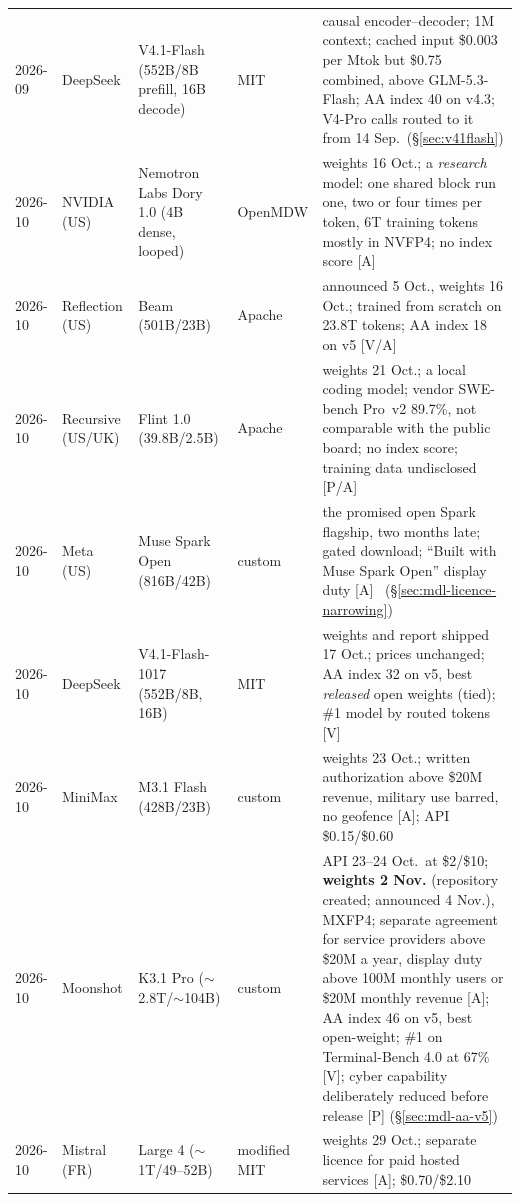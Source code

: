 {\begin{longtable}{p{15mm}p{17mm}p{28mm}p{14mm}p{58mm}}
    2026-09 & DeepSeek & V4.1-Flash (552B/8B prefill, 16B decode) & MIT & causal encoder--decoder; 1M context; cached input \$0.003 per Mtok but \$0.75 combined, above GLM-5.3-Flash; AA index 40 on v4.3; V4-Pro calls routed to it from 14 Sep.\ (\S\ref{sec:v41flash}) \\
    2026-10 & NVIDIA (US) & Nemotron Labs Dory 1.0 (4B dense, looped) & OpenMDW & weights 16 Oct.; a \emph{research} model: one shared block run one, two or four times per token, 6T training tokens mostly in NVFP4; no index score [A]~\cite{lit-dory} \\
    2026-10 & Reflection (US) & Beam (501B/23B) & Apache & announced 5 Oct., weights 16 Oct.; trained from scratch on 23.8T tokens; AA index 18 on v5 [V/A]~\cite{mdl-reflection-beam,lit-beam-aa} \\
    2026-10 & Recursive (US/UK) & Flint 1.0 (39.8B/2.5B) & Apache & weights 21 Oct.; a local coding model; vendor SWE-bench Pro~v2 89.7\%, not comparable with the public board; no index score; training data undisclosed [P/A]~\cite{lit-flint} \\
    2026-10 & Meta (US) & Muse Spark Open (816B/42B) & custom & the promised open Spark flagship, two months late; gated download; ``Built with Muse Spark Open'' display duty [A]~\cite{mdl-cleus-oct26} (\S\ref{sec:mdl-licence-narrowing}) \\
    2026-10 & DeepSeek & V4.1-Flash-1017 (552B/8B, 16B) & MIT & weights and report shipped 17 Oct.; prices unchanged; AA index 32 on v5, best \emph{released} open weights (tied); \#1 model by routed tokens [V]~\cite{mdl-v41flash-1017,mdl-aa-v5} \\
    2026-10 & MiniMax & M3.1 Flash (428B/23B) & custom & weights 23 Oct.; written authorization above \$20M revenue, military use barred, no geofence [A]; API \$0.15/\$0.60~\cite{mdl-minimax-m31} \\
    2026-10 & Moonshot & K3.1 Pro ($\sim$2.8T/$\sim$104B) & custom & API 23--24 Oct.\ at \$2/\$10; \textbf{weights 2 Nov.} (repository created; announced 4 Nov.), MXFP4; separate agreement for service providers above \$20M a year, display duty above 100M monthly users or \$20M monthly revenue [A]; AA index 46 on v5, best open-weight; \#1 on Terminal-Bench 4.0 at 67\% [V]; cyber capability deliberately reduced before release [P] (\S\ref{sec:mdl-aa-v5})~\cite{mdl-kimi-k31,lit-k31-weights} \\
    2026-10 & Mistral (FR) & Large 4 ($\sim$1T/49--52B) & modified MIT & weights 29 Oct.; separate licence for paid hosted services [A]; \$0.70/\$2.10~\cite{mdl-cleus-oct26,mdl-mistral-large4} \\

\end{longtable}}
